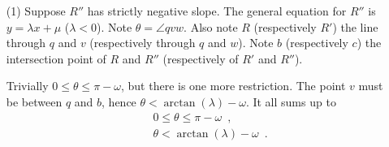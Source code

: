 \documentclass[11pt, oneside]{article}
\begin{document}
\begin{enumerate}
\item[(1)] Suppose $R''$ has strictly negative slope.
The general equation for $R''$ is $y=\lambda x+\mu$ ($\lambda<0$).
Note $\theta = \angle qvw$.
Also note $R$ 
(respectively $R'$)
the line through $q$ and $v$
(respectively through $q$ and $w$).
Note $b$ 
(respectively $c$)
the intersection point of $R$ and $R''$
(respectively of $R'$ and $R''$).

Trivially $0 \leq \theta \leq \pi-\omega$,
but there is one more restriction.
The point $v$ must be between $q$ and $b$,
hence $\theta < \arctan(\lambda)-\omega$.
It all sums up to
\begin{eqnarray}
\label{lemma arc fixed line minimal triangle constraint 1}
&&0 \leq \theta \leq \pi-\omega \enspace,\\
\label{lemma arc fixed line minimal triangle constraint 2}
&&\theta < \arctan(\lambda)-\omega \enspace.
\end{eqnarray}


\end{enumerate}
\end{document}
